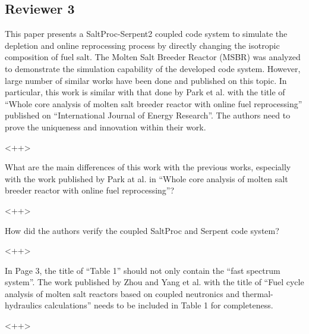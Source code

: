 \documentclass[answers,11pt]{exam}
\begin{document}
\begin{questions}
        \section*{Reviewer 3}

        \question This paper presents a SaltProc-Serpent2 coupled code system 
        to simulate the depletion and online reprocessing process by directly 
        changing the isotropic composition of fuel salt. The Molten Salt 
        Breeder Reactor (MSBR) was analyzed to demonstrate the simulation 
        capability of the developed code system. However, large number of 
        similar works have been done and published on this topic. In 
        particular, this work is similar with that done by Park et al. with the 
        title of ``Whole core analysis of molten salt breeder reactor with 
        online fuel reprocessing'' published on ``International Journal of Energy 
        Research''. The authors need to prove the uniqueness and innovation 
        within their work.
        \begin{solution}
                <++>
        \end{solution}


        \question  What are the main differences of this work with the previous 
        works, especially with the work published by Park at al. in ``Whole core 
        analysis of molten salt breeder reactor with online fuel reprocessing''?
        \begin{solution}
                <++>
        \end{solution}

        \question  How did the authors verify the coupled SaltProc and Serpent 
        code system?  \begin{solution}
                <++>
        \end{solution}

        \question  In Page 3, the title of ``Table 1'' should not only contain 
        the ``fast spectrum system''. The work published by Zhou and Yang et al. 
        with the title of ``Fuel cycle analysis of molten salt reactors based on 
        coupled neutronics and thermal-hydraulics calculations'' needs to be 
        included in Table 1 for completeness.
        \begin{solution}
                <++>
        \end{solution}


\end{questions}
\end{document}
